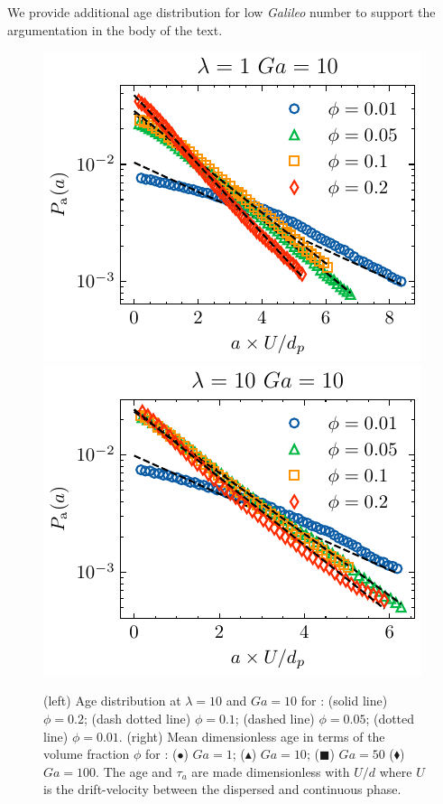 We provide additional age distribution for low \textit{Galileo} number to support the argumentation in the body of the text. 
\begin{figure}[h!]
    \centering
    \includegraphics[height = 0.3\textwidth]{image/HOMOGENEOUS_NEW/Dist/Pa_l_1_Ga_10.pdf}
    \includegraphics[height = 0.3\textwidth]{image/HOMOGENEOUS_NEW/Dist/Pa_l_10_Ga_10.pdf}
    \caption{(left) Age distribution at $\lambda = 10$ and $Ga = 10$ for : (solid line) $\phi = 0.2$; (dash dotted line) $\phi = 0.1$; (dashed line) $\phi =0.05$; (dotted line) $\phi = 0.01$. 
    (right) Mean dimensionless age in terms of the volume fraction $\phi$ for : 
    ($\bullet$) $Ga=1$; ($\blacktriangle$) $ Ga = 10$; ($\blacksquare$) $Ga = 50$ ($\blacklozenge$) $Ga =100$.
    The age and $\tau_a$ are made dimensionless with $U/d$ where $U$ is the drift-velocity between the dispersed and continuous phase.  }
    \label{fig:age_picture}
\end{figure}